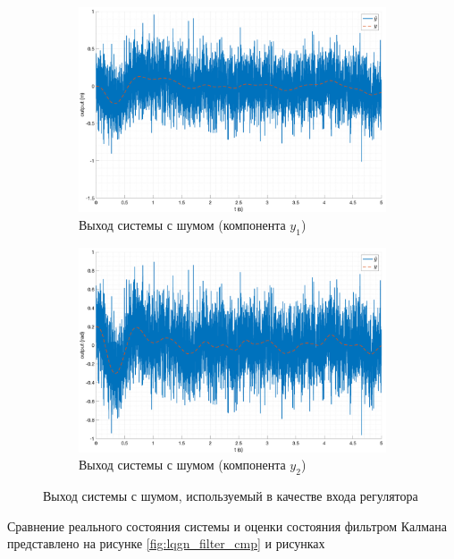 \begin{figure}[ht!]
    \begin{subfigure}[b]{0.45\textwidth}
        \centering
        \includegraphics[width=\textwidth]{media/plots/LQGn/observer_y1_cmp_1.png}
        \caption{Выход системы с шумом (компонента $y_1$)}
    \end{subfigure}
    \begin{subfigure}[b]{0.45\textwidth}
        \centering
        \includegraphics[width=\textwidth]{media/plots/LQGn/observer_y2_cmp_1.png}
        \caption{Выход системы с шумом (компонента $y_2$)}
    \end{subfigure}
    \caption{Выход системы с шумом, используемый в качестве входа регулятора}
    \label{fig:lqgn_filter_y}
\end{figure}
\FloatBarrier
Сравнение реального состояния системы и оценки состояния фильтром Калмана представлено на рисунке \ref{fig:lqgn_filter_cmp} и рисунках 
